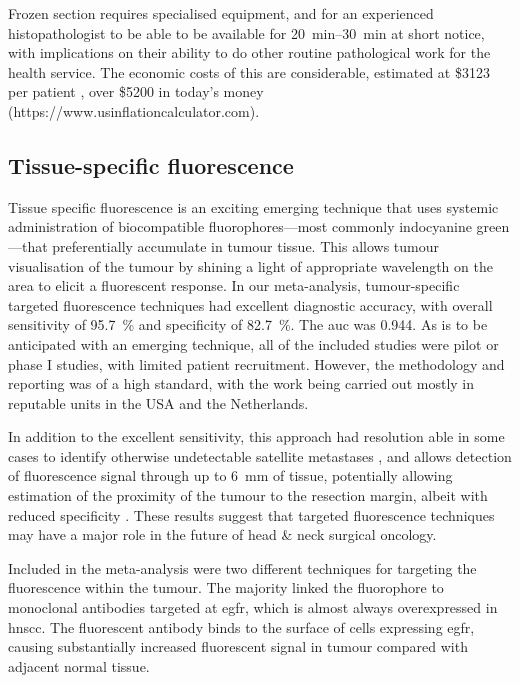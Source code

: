 Frozen section requires specialised equipment, and for an experienced histopathologist to be able to be available for \SIrange{20}{30}{\minute} at short notice, with implications on their ability to do other routine pathological work for the health service. 
The economic costs of this are considerable, estimated at \$3123 per patient \cite{dinardoAccuracyUtilityCost2000}, over \$5200 in today's money (https://www.usinflationcalculator.com).

\subsection{Tissue-specific fluorescence}

Tissue specific fluorescence is an exciting emerging technique that uses systemic administration of biocompatible fluorophores---most commonly indocyanine green---that preferentially accumulate in tumour tissue.
This allows tumour visualisation of the tumour by shining a light of appropriate wavelength on the area to elicit a fluorescent response.
In our meta-analysis, tumour-specific targeted fluorescence techniques had excellent diagnostic accuracy, with overall sensitivity of \SI{95.7}{\percent} and specificity of \SI{82.7}{\percent}. 
The \gls{auc} was 0.944.
As is to be anticipated with an emerging technique, all of the included studies were pilot or phase I studies, with limited patient recruitment. 
However, the methodology and reporting was of a high standard, with the work being carried out mostly in reputable units in the USA and the Netherlands.

In addition to the excellent sensitivity, this approach had resolution able in some cases to identify otherwise undetectable satellite metastases \cite{voskuilf.j.ImageguidedSurgeryTumor2019}, and allows detection of fluorescence signal through up to \SI{6}{\milli\metre} of tissue, potentially allowing estimation of the proximity of the tumour to the resection margin, albeit with reduced specificity \cite{vankeulenRapidNoninvasiveFluorescence2019}.
These results suggest that targeted fluorescence techniques may have a major role in the future of head \& neck surgical oncology.

Included in the meta-analysis were two different techniques for targeting the fluorescence within the tumour.
The majority linked the fluorophore to monoclonal antibodies  targeted at \gls{egfr}, which is almost always overexpressed in \gls{hnscc}\cite{chungIncreasedEpidermalGrowth2016}.
The fluorescent antibody binds to the surface of cells expressing \gls{egfr}, causing substantially increased fluorescent signal in tumour compared with adjacent normal tissue.

